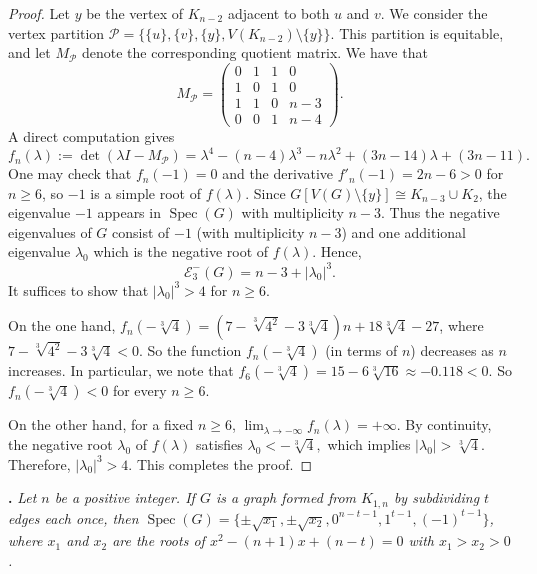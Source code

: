 \documentclass[a4paper,12pt]{article}
\theoremstyle{plain}
\begin{document}
\begin{proof}
Let $y$ be the vertex of $K_{n-2}$ adjacent to both $u$ and $v$.
We consider the vertex partition $
\mathcal{P}=\{\{u\},\{v\},\{y\},V(K_{n-2})\setminus\{y\}\}.$
This partition is equitable, and let $M_{\mathcal{P}}$ denote the corresponding quotient matrix. We have that  
$$M_{\mathcal{P}}=
\begin{pmatrix}
0 & 1 & 1 & 0\\
1 & 0 & 1 & 0\\
1 & 1 & 0 & n-3\\
0 & 0 & 1 & n-4
\end{pmatrix}.$$ 
A direct computation gives
$$f_n(\lambda):=\det(\lambda I-M_\mathcal{P})
=\lambda^4-(n-4)\lambda^3-n\lambda^2+(3n-14)\lambda+(3n-11).$$
One may check that $f_n(-1)=0$ and the derivative $f'_n(-1)=2n-6>0$ for $n\geq 6$, so $-1$ is a simple root of $f(\lambda)$. Since $G[V(G)\setminus\{y\}]\cong K_{n-3}\cup K_2$, the eigenvalue $-1$ appears in $\operatorname{Spec}(G)$ with multiplicity $n-3$. Thus the negative eigenvalues of $G$ consist of $-1$ (with multiplicity $n-3$) and one additional eigenvalue $\lambda_0$ which is the negative root of $f(\lambda)$. Hence,
$$\mathcal{E}_3^{-}(G)=n-3+|\lambda_0|^3.$$
It suffices to show that $|\lambda_0|^3>4$ for $n\geq 6$.

On the one hand, $f_n(-\sqrt[3]{4})=(7-\sqrt[3]{4^2}-3\sqrt[3]{4})n+18\sqrt[3]{4}-27$, where $7-\sqrt[3]{4^2}-3\sqrt[3]{4}<0$. So the function $f_n(-\sqrt[3]{4})$ (in terms of $n$) decreases as $n$ increases. In particular, we note that $f_6(-\sqrt[3]{4})=15-6\sqrt[3]{16}\approx -0.118  <0$. So $f_n(-\sqrt[3]{4})<0$ for every $n\geq 6$.

On the other hand, for a fixed $n\geq 6$, $\lim_{\lambda \to -\infty} f_n(\lambda) = +\infty.$ By continuity, the negative root $\lambda_0$ of $f(\lambda)$ satisfies $\lambda_0 < -\sqrt[3]{4},$ which implies $|\lambda_0| > \sqrt[3]{4}$. Therefore, $|\lambda_0|^3 > 4$. This completes the proof.
\end{proof}


\noindent
{\bf {}.}
\emph{Let $n$ be a positive integer. If $G$ is a graph formed from $K_{1,n}$ by subdividing $t$ edges each once, then $\operatorname{Spec}(G)=\{\pm\sqrt{x_1},\pm\sqrt{x_2},0^{n-t-1},1^{t-1},(-1)^{t-1}\}$, where $x_1$ and $x_2$ are the roots of $x^2-(n+1)x+(n-t)=0$ with $x_1>x_2>0$.}
\end{document}
